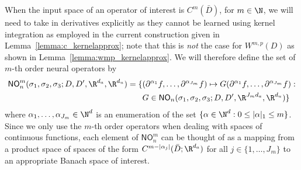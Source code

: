 When the input space of an operator of interest is \(C^m (\bar{D})\), for \(m \in \N\),
we will need to take in derivatives explicitly as they cannot be learned using kernel integration  as employed in the current 
construction given in Lemma~\ref{lemma:c_kernelapprox}; note that this is \textit{not} the case for \(W^{m,p}(D)\) as shown in Lemma~\ref{lemma:wmp_kernelapprox}.
We will therefore define the set of \(m\)-th order 
neural operators by
\begin{align*}
\mathsf{NO}_n^m(\sigma_1,\sigma_2,\sigma_3;D,D',\R^{d_a},\R^{d_u}) = \{&(\partial^{\alpha_1}f, \dots,\partial^{\alpha_{J_m}} f) \mapsto G(\partial^{\alpha_1}f, \dots,\partial^{\alpha_{J_m}} f) : \\
& G \in \mathsf{NO}_n (\sigma_1,\sigma_2,\sigma_3;D,D',\R^{J_m d_a}, \R^{d_u})\}
\end{align*}
where \(\alpha_1,\dots,\alpha_{J_m} \in \N^d\) is an enumeration of the set
\(\{\alpha \in \N^d : 0 \leq |\alpha|_1 \leq m\}\). Since we only use the \(m\)-th order operators when dealing with spaces of continuous functions, each element of \(\mathsf{NO}_n^m\) can be thought of as a mapping from a product space of spaces of the form \(C^{m - |\alpha_j|}(\bar{D};\R^{d_a})\) for all \(j \in \{1,\dots,J_m\}\) to an appropriate Banach space of interest.







